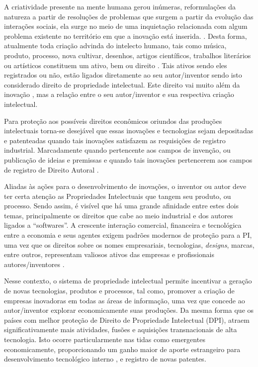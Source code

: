 A criatividade presente na mente humana gerou inúmeras, reformulações da natureza a partir de resoluções de problemas que surgem a partir da evolução das interações sociais, ela surge no meio de uma inquietação relacionada com algum problema existente no território em que a inovação está inserida. \cite{pacheco_dos_2018}. Desta forma, atualmente toda criação advinda do intelecto humano, tais como música, produto, processo, nova cultivar, desenhos, artigos científicos, trabalhos literários ou artísticos constituem um ativo, bem ou direito \cite{costa_interseccao_2011}. Tais ativos sendo eles registrados ou não, estão ligados diretamente ao seu autor/inventor sendo isto considerado direito de propriedade intelectual. Este direito vai muito além da inovação \cite{wipo_tratado_1970}, mas a relação entre o seu autor/inventor e sua respectiva criação intelectual.

Para proteção aos possíveis direitos econômicos oriundos das produções intelectuais torna-se desejável que essas inovações e tecnologias sejam depositadas e patenteadas quando tais inovações satisfazem as requisições de registro industrial. Marcadamente quando pertencente aos campos de invenção, ou publicação de ideias e premissas e quando tais inovações pertencerem aos campos de registro de Direito Autoral \cite{wipo_b06_2019}. 

Aliadas às ações para o desenvolvimento de inovações, o inventor ou autor deve ter certa atenção as Propriedades Intelectuais que tangem seu produto, ou processo. Sendo assim, é visível que há uma grande afinidade entre estes dois temas, principalmente os direitos que cabe ao meio industrial e dos autores ligados a “softwares”. A crescente interação comercial, financeira e tecnológica entre a economia e seus agentes exigem padrões modernos de proteção para a PI, uma vez que os direitos sobre os nomes empresariais, tecnologias, \textit{designs}, marcas, entre outros, representam valiosos ativos das empresas e profissionais autores/inventores \cite{sherwood_propriedade_1992}. 

Nesse contexto, o sistema de propriedade intelectual permite incentivar a geração de novas tecnologias, produtos e processos, tal como, promover a criação de empresas inovadoras em todas as áreas de informação, uma vez que concede ao autor/inventor explorar economicamente suas produções. Da mesma forma que os países com melhor proteção de Direito de Propriedade Intelectual (DPI), atraem significativamente mais atividades, fusões e aquisições transnacionais de alta tecnologia. Isto ocorre particularmente nas tidas como emergentes economicamente, proporcionando um ganho maior de aporte estrangeiro para desenvolvimento tecnológico interno \cite{hasan_impacts_2017}, e registro de novas patentes.

